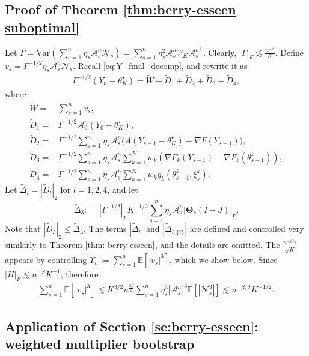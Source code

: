 \documentclass[a4paper,11pt]{article}
\numberwithin{equation}{section}
\theoremstyle{plain}
\theoremstyle{remark}
\def\IE{\mathbb{E}}
\def\bT{\mathbf{\Theta}}
\newcommand{\shift}[2]{#1_{#2, \{i\}}}
\newcommand{\minparam}{\theta^\star_K}
\newcommand{\var}{\mathrm{Var}}
\begin{document}
\subsection{Proof of Theorem \ref{thm:berry-esseen suboptimal}}\label{proof_thm_2.2}
 Let $\Gamma= \var(\sum_{s=1}^n \eta_s \mathcal{A}_s^n \mathcal{N}_s)=\sum_{s=1}^n \eta_s^2 \mathcal{A}_s^n \mathcal{V}_K \mathcal{A}_s^{n^\top}$. Clearly, $|\Gamma|_F \lesssim \frac{n^{-\beta}}{K}$. Define $v_s = \Gamma^{-1/2} \eta_s \mathcal{A}_s^n \mathcal{N}_s$. Recall \eqref{eq:Y_final_decomp}, and rewrite it as 
 \begin{align}
     \Gamma^{-1/2}(Y_n - \minparam) = \tilde{W} + \tilde{D}_1+\tilde{D}_2+ \tilde{D}_3+\tilde{D}_4,
 \end{align}
 where 
 \begin{align}
     \tilde{W} =& \sum_{s=1}^n v_s, \nonumber\\
     \tilde{D}_1 =& \Gamma^{-1/2} \mathcal{A}_0^n (Y_0 - \minparam), \nonumber\\
      \tilde{D}_2 =& \Gamma^{-1/2} \sum_{s=1}^n \eta_s \mathcal{A}_s^n \big( A (Y_{s-1} - \minparam) - \nabla F(Y_{s-1}) \big) , \nonumber\\
       \tilde{D}_3 =& \Gamma^{-1/2} \sum_{s=1}^n \eta_s \mathcal{A}_s^n \sum_{k=1}^K w_k (\nabla F_k(Y_{s-1}) - \nabla F_k(\theta_{s-1}^k) ) , \nonumber\\
        \tilde{D}_4 =& \Gamma^{-1/2} \sum_{s=1}^n \eta_s \mathcal{A}_s^n \sum_{k=1}^K w_k g_k(\theta_{s-1}^k, \xi_s^k). \nonumber
 \end{align}
 Let $\tilde{\Delta}_l=|\tilde{D}_l|_2$ for $l=1,2,4$, and let 
 \[ \tilde{\Delta}_3: = |\Gamma^{-1/2}|_F K^{-1/2} \sum_{s=1}^n \eta_s \mathcal{A}_s^n |\bT_s(I-J)|_F. \]
 Note that $|\tilde{D}_3|_2 \leq \tilde{\Delta}_3.$ The terms $|\tilde{\Delta}_l|$ and $|\shift{\tilde{\Delta}}{l}|$ are defined and controlled very similarly to Theorem \ref{thm: berry-esseen}, and the details are omitted. The $\frac{n^{-\beta/2}}{\sqrt{K}}$ appears by controlling $\tilde{\Upsilon}_n:=\sum_{s=1}^n \IE[|v_s|^3]$, which we show below.
Since $|H|_F \lesssim n^{-\beta}K^{-1}$, therefore
\begin{align*}
    \sum_{s=1}^n \IE[|v_s|^3] \lesssim K^{3/2}n^{\frac{3\beta}{2}} \sum_{s=1}^n \eta_s^3 |\mathcal{A}_s^n|^3 \IE[|\mathcal{N}_s^3|] \lesssim n^{-\beta/2} K^{-1/2}.
\end{align*}

\subsection{Application of Section \ref{se:berry-esseen}: weighted multiplier bootstrap} \label{se:weighted-bootstrap}
 
\end{document}
